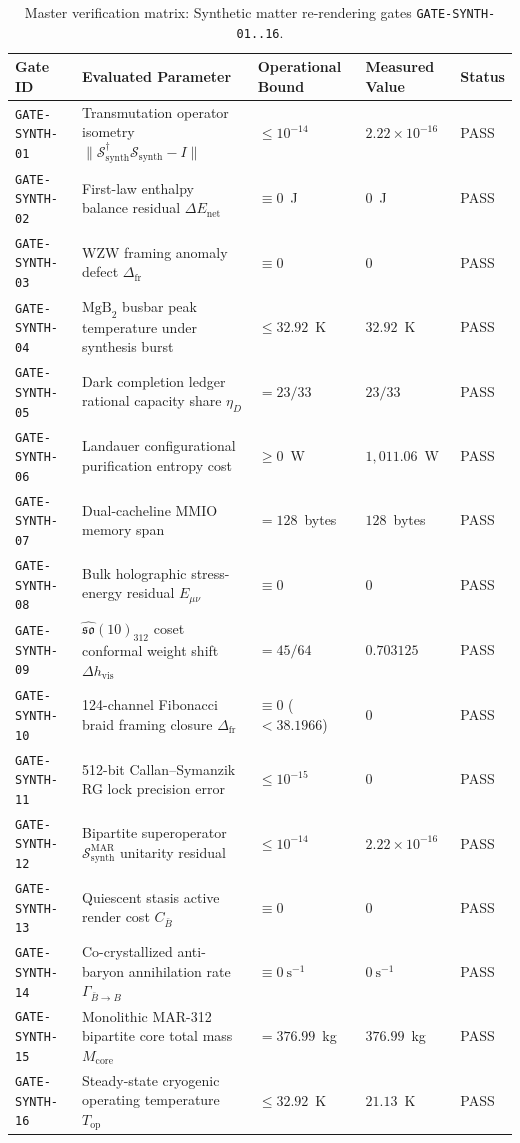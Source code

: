 \documentclass[11pt,onecolumn]{article}
\begin{document}
\begin{table}[!htbp]
\centering\small
\caption{Master verification matrix: Synthetic matter re-rendering gates \texttt{GATE-SYNTH-01..16}.}
\label{tab:matrix_synth}
\begin{tabularx}{\textwidth}{@{}l p{4.6cm} p{3.2cm} p{3.2cm} l@{}}
\toprule
Gate ID & Evaluated Parameter & Operational Bound & Measured Value & Status \\
\midrule
\texttt{GATE-SYNTH-01} & Transmutation operator isometry $\|\mathcal{S}_{\text{synth}}^\dagger \mathcal{S}_{\text{synth}} - I\|$ & $\le 10^{-14}$ & $2.22\times 10^{-16}$ & PASS \\
\texttt{GATE-SYNTH-02} & First-law enthalpy balance residual $\Delta E_{\text{net}}$ & $\equiv 0$~J & $0$~J & PASS \\
\texttt{GATE-SYNTH-03} & WZW framing anomaly defect $\Delta_{\text{fr}}$ & $\equiv 0$ & $0$ & PASS \\
\texttt{GATE-SYNTH-04} & $\text{MgB}_2$ busbar peak temperature under synthesis burst & $\le 32.92$~K & $32.92$~K & PASS \\
\texttt{GATE-SYNTH-05} & Dark completion ledger rational capacity share $\eta_D$ & $= 23/33$ & $23/33$ & PASS \\
\texttt{GATE-SYNTH-06} & Landauer configurational purification entropy cost & $\ge 0$~W & $1{,}011.06$~W & PASS \\
\texttt{GATE-SYNTH-07} & Dual-cacheline MMIO memory span & $= 128$~bytes & $128$~bytes & PASS \\
\texttt{GATE-SYNTH-08} & Bulk holographic stress-energy residual $E_{\mu\nu}$ & $\equiv 0$ & $0$ & PASS \\
\texttt{GATE-SYNTH-09} & $\widehat{\mathfrak{so}}(10)_{312}$ coset conformal weight shift $\Delta h_{\text{vis}}$ & $= 45/64$ & $0.703125$ & PASS \\
\texttt{GATE-SYNTH-10} & 124-channel Fibonacci braid framing closure $\Delta_{\text{fr}}$ & $\equiv 0$ ($<38.1966$) & $0$ & PASS \\
\texttt{GATE-SYNTH-11} & 512-bit Callan--Symanzik RG lock precision error & $\le 10^{-15}$ & $0$ & PASS \\
\texttt{GATE-SYNTH-12} & Bipartite superoperator $\mathcal{S}_{\text{synth}}^{\text{MAR}}$ unitarity residual & $\le 10^{-14}$ & $2.22\times 10^{-16}$ & PASS \\
\texttt{GATE-SYNTH-13} & Quiescent stasis active render cost $C_{\bar{B}}$ & $\equiv 0$ & $0$ & PASS \\
\texttt{GATE-SYNTH-14} & Co-crystallized anti-baryon annihilation rate $\Gamma_{\bar{B}\to B}$ & $\equiv 0~\text{s}^{-1}$ & $0~\text{s}^{-1}$ & PASS \\
\texttt{GATE-SYNTH-15} & Monolithic MAR-312 bipartite core total mass $M_{\text{core}}$ & $= 376.99$~kg & $376.99$~kg & PASS \\
\texttt{GATE-SYNTH-16} & Steady-state cryogenic operating temperature $T_{\text{op}}$ & $\le 32.92$~K & $21.13$~K & PASS \\
\bottomrule
\end{tabularx}
\end{table}
\end{document}
